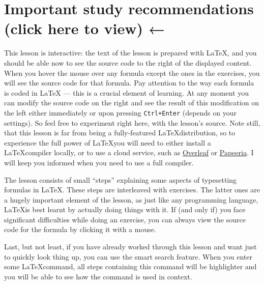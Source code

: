 \section{Important study recommendations (click here to view) ←}
\par This lesson is interactive: the text of the lesson is prepared with \LaTeX, and you should be able now to see the source code to the right of the displayed content. When you hover the mouse over any formula except the ones in the exercises, you will see the source code for that formula. Pay attention to the way each formula is coded in LaTeX — this is a crucial element of learning. At any moment you can modify the source code on the right and see the result of this modification on the left either immediately or upon pressing \verb"Ctrl+Enter" (depends on your settings). So feel free to experiment right here, with the lesson’s source. Note still, that this lesson is far from being a fully-featured \LaTeX distribution, so to experience the full power of \LaTeX you will need to either install a \LaTeX compiler locally, or to use a cloud service, such as \href{https://www.overleaf.com/}{Overleaf} or \href{https://papeeria.com/landing}{Papeeria}. I will keep you informed when you need to use a full compiler.
\par The lesson consists of small “steps” explaining some aspects of typesetting formulas in \LaTeX. These steps are interleaved with exercises. The latter ones are a hugely important element of the lesson, as just like any programming language, \LaTeX is best learnt by actually doing things with it. If (and only if) you face significant difficulties while doing an exercise, you can always view the source code for the formula by clicking it with a mouse.
\par Last, but not least, if you have already worked through this lesson and want just to quickly look thing up, you can use the smart search feature. When you enter some \LaTeX command, all steps containing this command will be highlighter and you will be able to see how the command is used in context.